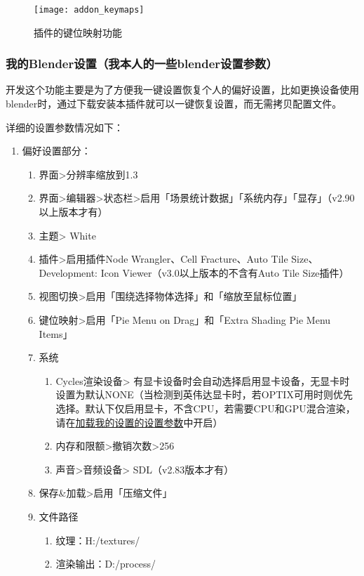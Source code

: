 \documentclass{../../public_resources/doc}
\begin{document}
\begin{figure}[h!]
    \centering
    \texttt{[image: addon\_keymaps]}
    \caption{插件的键位映射功能}
    \label{插件的键位映射功能}
\end{figure}

\subsubsection{我的Blender设置（我本人的一些blender设置参数）}
\hypertarget{MySettings}{}
开发这个功能主要是为了方便我一键设置恢复个人的偏好设置，比如更换设备使用blender时，通过下载安装本插件就可以一键恢复设置，而无需拷贝配置文件。

详细的设置参数情况如下：
\begin{enumerate}
    \item 偏好设置部分：
    \begin{enumerate}
        \item 界面>分辨率缩放到1.3
        \item 界面>编辑器>状态栏>启用「场景统计数据」「系统内存」「显存」（v2.90以上版本才有）
        \item 主题> White
        \item 插件>启用插件Node Wrangler、Cell Fracture、Auto Tile Size、Development: Icon Viewer（v3.0以上版本的不含有Auto Tile Size插件）
        \item 视图切换>启用「围绕选择物体选择」和「缩放至鼠标位置」
        \item 键位映射>启用「Pie Menu on Drag」和「Extra Shading Pie Menu Items」
        \item 系统
        \begin{enumerate}
            \item Cycles渲染设备> 有显卡设备时会自动选择启用显卡设备，无显卡时设置为默认NONE（当检测到英伟达显卡时，若OPTIX可用时则优先选择。默认下仅启用显卡，不含CPU，若需要CPU和GPU混合渲染，请在\hyperlink{加载我的设置小节}{加载我的设置的设置参数}中开启）
            \item 内存和限额>撤销次数>256
            \item 声音>音频设备> SDL（v2.83版本才有）
        \end{enumerate}
        \item 保存\&加载>启用「压缩文件」
        \item 文件路径
        \begin{enumerate}
            \item 纹理：H:/textures/
            \item 渲染输出：D:/process/

\end{enumerate}
\end{enumerate}
\end{enumerate}
\end{document}
